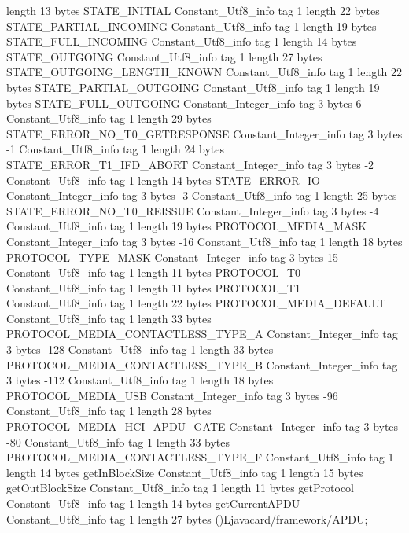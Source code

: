 {{{			length	13
			bytes	STATE_INITIAL
		}
		Constant_Utf8_info {
			tag	1
			length	22
			bytes	STATE_PARTIAL_INCOMING
		}
		Constant_Utf8_info {
			tag	1
			length	19
			bytes	STATE_FULL_INCOMING
		}
		Constant_Utf8_info {
			tag	1
			length	14
			bytes	STATE_OUTGOING
		}
		Constant_Utf8_info {
			tag	1
			length	27
			bytes	STATE_OUTGOING_LENGTH_KNOWN
		}
		Constant_Utf8_info {
			tag	1
			length	22
			bytes	STATE_PARTIAL_OUTGOING
		}
		Constant_Utf8_info {
			tag	1
			length	19
			bytes	STATE_FULL_OUTGOING
		}
		Constant_Integer_info {
			tag	3
			bytes	6
		}
		Constant_Utf8_info {
			tag	1
			length	29
			bytes	STATE_ERROR_NO_T0_GETRESPONSE
		}
		Constant_Integer_info {
			tag	3
			bytes	-1
		}
		Constant_Utf8_info {
			tag	1
			length	24
			bytes	STATE_ERROR_T1_IFD_ABORT
		}
		Constant_Integer_info {
			tag	3
			bytes	-2
		}
		Constant_Utf8_info {
			tag	1
			length	14
			bytes	STATE_ERROR_IO
		}
		Constant_Integer_info {
			tag	3
			bytes	-3
		}
		Constant_Utf8_info {
			tag	1
			length	25
			bytes	STATE_ERROR_NO_T0_REISSUE
		}
		Constant_Integer_info {
			tag	3
			bytes	-4
		}
		Constant_Utf8_info {
			tag	1
			length	19
			bytes	PROTOCOL_MEDIA_MASK
		}
		Constant_Integer_info {
			tag	3
			bytes	-16
		}
		Constant_Utf8_info {
			tag	1
			length	18
			bytes	PROTOCOL_TYPE_MASK
		}
		Constant_Integer_info {
			tag	3
			bytes	15
		}
		Constant_Utf8_info {
			tag	1
			length	11
			bytes	PROTOCOL_T0
		}
		Constant_Utf8_info {
			tag	1
			length	11
			bytes	PROTOCOL_T1
		}
		Constant_Utf8_info {
			tag	1
			length	22
			bytes	PROTOCOL_MEDIA_DEFAULT
		}
		Constant_Utf8_info {
			tag	1
			length	33
			bytes	PROTOCOL_MEDIA_CONTACTLESS_TYPE_A
		}
		Constant_Integer_info {
			tag	3
			bytes	-128
		}
		Constant_Utf8_info {
			tag	1
			length	33
			bytes	PROTOCOL_MEDIA_CONTACTLESS_TYPE_B
		}
		Constant_Integer_info {
			tag	3
			bytes	-112
		}
		Constant_Utf8_info {
			tag	1
			length	18
			bytes	PROTOCOL_MEDIA_USB
		}
		Constant_Integer_info {
			tag	3
			bytes	-96
		}
		Constant_Utf8_info {
			tag	1
			length	28
			bytes	PROTOCOL_MEDIA_HCI_APDU_GATE
		}
		Constant_Integer_info {
			tag	3
			bytes	-80
		}
		Constant_Utf8_info {
			tag	1
			length	33
			bytes	PROTOCOL_MEDIA_CONTACTLESS_TYPE_F
		}
		Constant_Utf8_info {
			tag	1
			length	14
			bytes	getInBlockSize
		}
		Constant_Utf8_info {
			tag	1
			length	15
			bytes	getOutBlockSize
		}
		Constant_Utf8_info {
			tag	1
			length	11
			bytes	getProtocol
		}
		Constant_Utf8_info {
			tag	1
			length	14
			bytes	getCurrentAPDU
		}
		Constant_Utf8_info {
			tag	1
			length	27
			bytes	()Ljavacard/framework/APDU;
}}}
